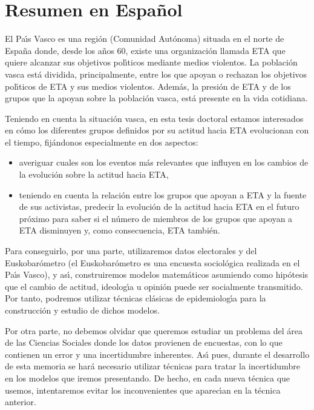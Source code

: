 
\chapter*{Resumen en Espa\~{n}ol}
El Pa\'{\i}s Vasco es una regi\'on (Comunidad Aut\'onoma) situada en el norte de Espa\~{n}a donde, desde los a\~{n}os 60, existe una organizaci\'on llamada ETA que quiere alcanzar sus objetivos pol\'{\i}ticos mediante medios violentos. La poblaci\'on vasca est\'a dividida, principalmente, entre los que apoyan o re\-cha\-zan los objetivos pol\'{\i}ticos de ETA y sus medios violentos. Adem\'as, la presi\'on de ETA y de los grupos que la apoyan sobre la poblaci\'on vasca, est\'a presente en la vida cotidiana. 

Teniendo en cuenta la situaci\'on vasca, en esta tesis doctoral estamos interesados en c\'omo los diferentes grupos definidos por su actitud hacia ETA evolucionan con el tiempo, fij\'andonos especialmente en dos aspectos:

\begin{itemize}
\item averiguar cuales son los eventos m\'as relevantes que influyen en los cambios de la evoluci\'on sobre la actitud hacia ETA,
\item teniendo en cuenta la relaci\'on entre los grupos que apoyan a ETA y la fuente de sus activistas, predecir la evoluci\'on de la actitud hacia ETA en el futuro pr\'oximo para saber si el n\'umero de miembros de los grupos que apoyan a ETA disminuyen y, como consecuencia, ETA tambi\'en.
\end{itemize}

Para conseguirlo, por una parte, utilizaremos datos electorales y del Eus\-kobar\'ometro (el Euskobar\'ometro es una encuesta sociol\'ogica realizada en el Pa\'{\i}s Vasco), y as\'{\i}, construiremos modelos matem\'aticos asumiendo como hip\'otesis que el cambio de actitud, ideolog\'{\i}a u opini\'on puede ser socialmente transmitido. Por tanto, podremos utilizar t\'ecnicas cl\'asicas de epidemiolog\'{\i}a para la construcci\'on y estudio de dichos modelos.

Por otra parte, no debemos olvidar que queremos estudiar un problema del \'area de las Ciencias Sociales donde los datos provienen de encuestas, con lo que contienen un error y una incertidumbre inherentes. As\'{\i} pues, durante el desarrollo de esta memoria se har\'a necesario utilizar t\'ecnicas para tratar la incertidumbre en los modelos que iremos presentando. De hecho, en cada nueva t\'ecnica que usemos, intentaremos evitar los inconvenientes que aparec\'{\i}an en la t\'ecnica anterior. 

